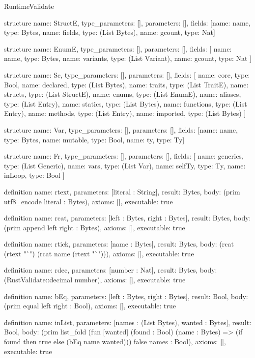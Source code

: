 \begin{lexlean}{RuntimeValidate}
\begin{semanticmodule}
structure{
  name: StructE,
  type_parameters: [],
  parameters: [],
  fields: [{name: name, type: Bytes}, {name: fields, type: (List Bytes)}, {name: gcount, type: Nat}]
}

structure{
  name: EnumE,
  type_parameters: [],
  parameters: [],
  fields: [
    {name: name, type: Bytes},
    {name: variants, type: (List Variant)},
    {name: gcount, type: Nat}
  ]
}

structure{
  name: Sc,
  type_parameters: [],
  parameters: [],
  fields: [
    {name: core, type: Bool},
    {name: declared, type: (List Bytes)},
    {name: traits, type: (List TraitE)},
    {name: structs, type: (List StructE)},
    {name: enums, type: (List EnumE)},
    {name: aliases, type: (List Entry)},
    {name: statics, type: (List Bytes)},
    {name: functions, type: (List Entry)},
    {name: methods, type: (List Entry)},
    {name: imported, type: (List Bytes)}
  ]
}

structure{
  name: Var,
  type_parameters: [],
  parameters: [],
  fields: [{name: name, type: Bytes}, {name: mutable, type: Bool}, {name: ty, type: Ty}]
}

structure{
  name: Fr,
  type_parameters: [],
  parameters: [],
  fields: [
    {name: generics, type: (List Generic)},
    {name: vars, type: (List Var)},
    {name: selfTy, type: Ty},
    {name: inLoop, type: Bool}
  ]
}

definition{
  name: rtext,
  parameters: [literal : String],
  result: Bytes,
  body: (prim utf8_encode literal : Bytes),
  axioms: [],
  executable: true
}

definition{
  name: rcat,
  parameters: [left : Bytes, right : Bytes],
  result: Bytes,
  body: (prim append left right : Bytes),
  axioms: [],
  executable: true
}

definition{
  name: rtick,
  parameters: [name : Bytes],
  result: Bytes,
  body: (rcat (rtext "`") (rcat name (rtext "`"))),
  axioms: [],
  executable: true
}

definition{
  name: rdec,
  parameters: [number : Nat],
  result: Bytes,
  body: (RustValidate::decimal number),
  axioms: [],
  executable: true
}

definition{
  name: bEq,
  parameters: [left : Bytes, right : Bytes],
  result: Bool,
  body: (prim equal left right : Bool),
  axioms: [],
  executable: true
}

definition{
  name: inList,
  parameters: [names : (List Bytes), wanted : Bytes],
  result: Bool,
  body: (prim list_fold (fun [wanted] (found : Bool) (name : Bytes) => (if found then true else (bEq name wanted))) false names : Bool),
  axioms: [],
  executable: true
}


\end{semanticmodule}
\end{lexlean}
